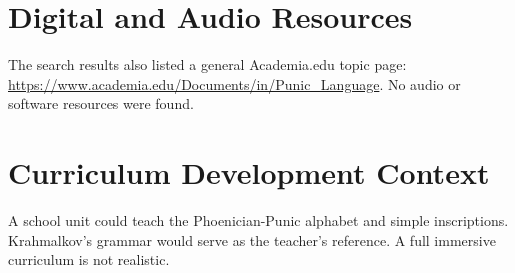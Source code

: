 \documentclass[12pt]{article}
\begin{document}
\section{Digital and Audio Resources}
The search results also listed a general Academia.edu topic page: \url{https://www.academia.edu/Documents/in/Punic_Language}. No audio or software resources were found.

\section{Curriculum Development Context}
A school unit could teach the Phoenician-Punic alphabet and simple inscriptions. Krahmalkov's grammar would serve as the teacher's reference. A full immersive curriculum is not realistic.
\end{document}
